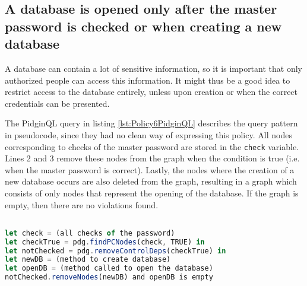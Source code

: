 

\subsection{A database is opened only after the master password
is checked or when creating a new database}
\label{subsec:DBOpen}

A database can contain a lot of sensitive information, so it is important that only authorized people can access this information. It might thus be a good idea to restrict access to the database entirely, unless upon creation or when the correct credentials can be presented. 

The PidginQL query in listing \ref{lst:Policy6PidginQL} describes the query pattern in pseudocode, since they had no clean way of expressing this policy. All nodes corresponding to checks of the master password are stored in the \texttt{check} variable. Lines 2 and 3 remove these nodes from the graph when the condition is true (i.e. when the master password is correct). Lastly, the nodes where the creation of a new database occurs are also deleted from the graph, resulting in a graph which consists of only nodes that represent the opening of the database. If the graph is empty, then there are no violations found.

\begin{lstlisting}[label={lst:Policy6PidginQL},language=JavaScript,caption=Policy 6 in PidginQL,mathescape=true]  % float=t?

let check = (all checks of the password)
let checkTrue = pdg.findPCNodes(check, TRUE) in
let notChecked = pdg.removeControlDeps(checkTrue) in
let newDB = (method to create database)
let openDB = (method called to open the database)
notChecked.removeNodes(newDB) and openDB is empty
\end{lstlisting}

